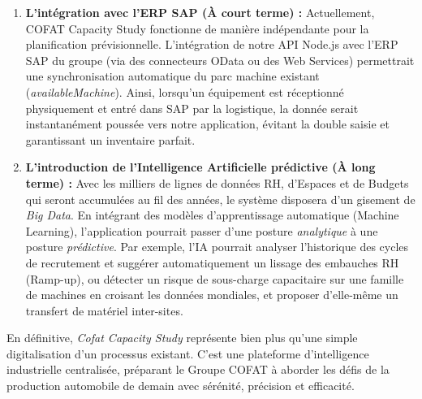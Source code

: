 \begin{enumerate}
    \item \textbf{L'intégration avec l'ERP SAP (À court terme) :} Actuellement, COFAT Capacity Study fonctionne de manière indépendante pour la planification prévisionnelle. L'intégration de notre API Node.js avec l'ERP SAP du groupe (via des connecteurs OData ou des Web Services) permettrait une synchronisation automatique du parc machine existant (\textit{availableMachine}). Ainsi, lorsqu'un équipement est réceptionné physiquement et entré dans SAP par la logistique, la donnée serait instantanément poussée vers notre application, évitant la double saisie et garantissant un inventaire parfait.
    
    \item \textbf{L'introduction de l'Intelligence Artificielle prédictive (À long terme) :} Avec les milliers de lignes de données RH, d'Espaces et de Budgets qui seront accumulées au fil des années, le système disposera d'un gisement de \textit{Big Data}. En intégrant des modèles d'apprentissage automatique (Machine Learning), l'application pourrait passer d'une posture \textit{analytique} à une posture \textit{prédictive}. Par exemple, l'IA pourrait analyser l'historique des cycles de recrutement et suggérer automatiquement un lissage des embauches RH (Ramp-up), ou détecter un risque de sous-charge capacitaire sur une famille de machines en croisant les données mondiales, et proposer d'elle-même un transfert de matériel inter-sites.
\end{enumerate}

En définitive, \textit{Cofat Capacity Study} représente bien plus qu'une simple digitalisation d'un processus existant. C'est une plateforme d'intelligence industrielle centralisée, préparant le Groupe COFAT à aborder les défis de la production automobile de demain avec sérénité, précision et efficacité.
